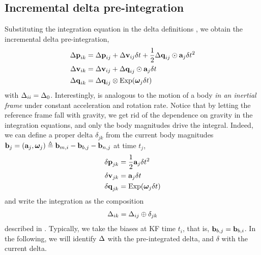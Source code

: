 \subsection{Incremental delta pre-integration}

Substituting the integration equation  in the delta definitions , we obtain the incremental delta pre-integration,
%
\begin{align}\label{equ:g_second_order_pre-integration}
\begin{split}
{\Delta{\bf p}}_{ik} 
&= {\Delta{\bf p}}_{ij} + {\Delta{\bf v}}_{ij}\delta t + \frac12{\Delta{\bf q}}_{ij}\odot{\bf a}_j\delta t^2 \\
{\Delta{\bf v}}_{ik} 
&= {\Delta{\bf v}}_{ij} + {\Delta{\bf q}}_{ij}\odot{\bf a}_j\delta t \\
{\Delta{\bf q}}_{ik} 
&= {\Delta{\bf q}}_{ij}\otimes\operatorname*{Exp}({{\bm \omega}}_j\delta t) 
\end{split}
\end{align}
%
with $\Delta_{ii}=\Delta_0$.
Interestingly,  is analogous to the motion of a body \emph{in an inertial frame} under constant acceleration and rotation rate.
Notice that by letting the reference frame fall with gravity, we get rid of the dependence on gravity in the integration equations, and only the body magnitudes drive  the integral.
Indeed, we can define a proper delta $\delta_{jk}$ from the current body magnitudes ${\bf b}_j=({\bf a}_j,{{\bm \omega}}_j) \triangleq {\bf b}_{m,i} - {\bf b}_{b,j} - {\bf b}_{n,j}$ at time $t_j$,
%
\begin{align}\label{equ:delta_creation}
\begin{split}
{\delta{\bf p}}_{jk} &= \frac12{\bf a}_j\delta t^2 \\
{\delta{\bf v}}_{jk} &= {\bf a}_j\delta t \\
{\delta{\bf q}}_{jk} &= \operatorname*{Exp}({{\bm \omega}}_j\delta t)
\end{split}
\end{align}
%
and write the integration  as the composition 
%
\begin{align}\label{equ:composition_compact}
\Delta_{ik}=\Delta_{ij}\oplus\delta_{jk}
\end{align}
%
described in . 
Typically, we take the biases at KF time $t_i$, that is, ${\bf b}_{b,j} = {\bf b}_{b,i}$.
In the following, we will identify $\Delta$ with the pre-integrated delta, and $\delta$ with the current delta.


